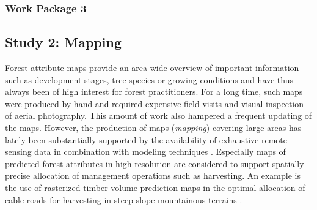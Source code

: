 \subsubsection{Work Package 3} %

%
%
%
%
%

\newpage
\subsection{Study 2: Mapping} %


Forest attribute maps provide an area-wide overview of important information such as development stages, tree species or growing conditions and have thus always been of high interest for forest practitioners. For a long time, such maps were produced by hand and required expensive field visits and visual inspection of aerial photography. This amount of work also hampered a frequent updating of the maps. However, the production of maps (\textit{mapping}) covering large areas has lately been substantially supported by the availability of exhaustive remote sensing data in combination with modeling techniques \citep{brosofske2014}. Especially maps of predicted forest attributes in high resolution are considered to support spatially precise allocation of management operations such as harvesting. An example is the use of rasterized timber volume prediction maps in the optimal allocation of cable roads for harvesting in steep slope mountainous terrains \citep{bont2012, bont2015}.\par

